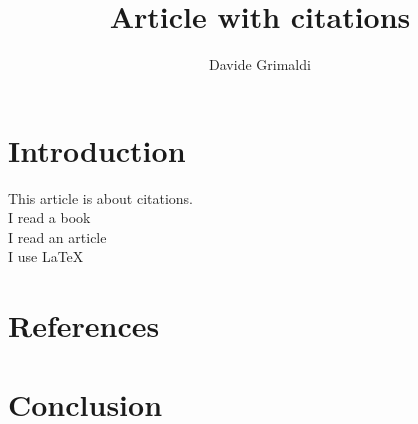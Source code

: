 \documentclass{article}
\title{Article with citations}
\author{Davide Grimaldi}
\date{}
\begin{document}
    \maketitle
    \section{Introduction}
        This article is about citations. \\
        I read a book~\cite{campbell2019} \\
        I read an article~\cite{smith2020} \\
        I use \LaTeX~\cite{latex} \\
    \section{References}

    \section{Conclusion}
\end{document}
